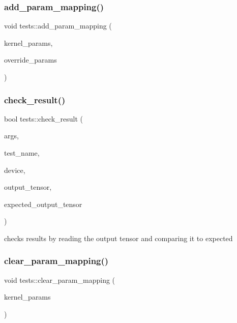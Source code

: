 \subsubsection{\texorpdfstring{add\+\_\+param\+\_\+mapping()}{add\_param\_mapping()}\hspace{0.1cm}{\footnotesize\ttfamily [2/2]}}
{\footnotesize\ttfamily void tests\+::add\+\_\+param\+\_\+mapping (\begin{DoxyParamCaption}\item[{\hyperlink{structtests_1_1KernelParams}{Kernel\+Params} \&}]{kernel\+\_\+params,  }\item[{std\+::map$<$ std\+::string, std\+::string $>$ \&}]{override\+\_\+params }\end{DoxyParamCaption})}

\mbox{\label{namespacetests_aa238e405385c3782bb56e0d2c5d5c6a2}} 
\subsubsection{\texorpdfstring{check\+\_\+result()}{check\_result()}}
{\footnotesize\ttfamily bool tests\+::check\+\_\+result (\begin{DoxyParamCaption}\item[{\hyperlink{structtests_1_1TestArgs}{tests\+::\+Test\+Args} \&}]{args,  }\item[{std\+::string}]{test\+\_\+name,  }\item[{\hyperlink{classllk_1_1Device}{llk\+::\+Device} \&}]{device,  }\item[{\hyperlink{classllk_1_1Tensor}{llk\+::\+Tensor}}]{output\+\_\+tensor,  }\item[{\hyperlink{classllk_1_1Tensor}{llk\+::\+Tensor}}]{expected\+\_\+output\+\_\+tensor }\end{DoxyParamCaption})}



checks results by reading the output tensor and comparing it to expected 

\mbox{\label{namespacetests_a669b08c547907fe0dcb3219b3b8142c7}} 
\subsubsection{\texorpdfstring{clear\+\_\+param\+\_\+mapping()}{clear\_param\_mapping()}}
{\footnotesize\ttfamily void tests\+::clear\+\_\+param\+\_\+mapping (\begin{DoxyParamCaption}\item[{\hyperlink{structtests_1_1KernelParams}{Kernel\+Params} \&}]{kernel\+\_\+params }\end{DoxyParamCaption})}

